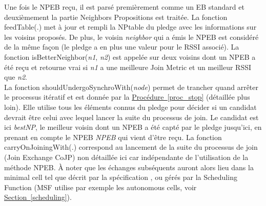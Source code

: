 \documentclass[]{report}
\newcommand{\wordlink}[2]{\hyperref[#2]{#1~\ref{#2}}}
\begin{document}
Une fois le NPEB reçu, il est parsé premièrement comme un EB standard et deuxièmement la partie Neighbors Propositions est traitée. La fonction feedTable(.) met à jour et rempli la NPtable du pledge avec les informations sur les voisins proposés. De plus, le voisin \textit{neighbor} qui a émis le NPEB est considéré de la même façon (le pledge a en plus une valeur pour le RSSI associé). La fonction isBetterNeighbor(\textit{n1}, \textit{n2}) est appelée sur deux voisins dont un NPEB a été reçu et retourne vrai si \textit{n1} a une meilleure Join Metric et un meilleur RSSI que \textit{n2}.\\

La fonction shouldUndergoSynchroWith(\textit{node}) permet de trancher quand arrêter le processus itératif et est donnée par la \wordlink{Procédure}{proc_stop} (détaillée plus loin). Elle utilise tous les éléments connus du pledge pour décider si un candidat devrait être celui avec lequel lancer la suite du processus de join. Le candidat est ici \textit{bestNP}, le meilleur voisin dont un NPEB a été capté par le pledge jusqu'ici, en prenant en compte le NPEB \textit{NPEB} qui vient d'être reçu. La fonction carryOnJoiningWith(.) correspond au lancement de la suite du processus de join (Join Exchange CoJP) non détaillée ici car indépendante de l'utilisation de la méthode NPEB. À noter que les échanges subséquents auront alors lieu dans la minimal cell tel que décrit par la spécification \cite{rfc8180}, ou gérés par la Scheduling Function (MSF utilise par exemple les autonomous cells, voir \wordlink{Section}{scheduling}).\\

\newpage
\end{document}
